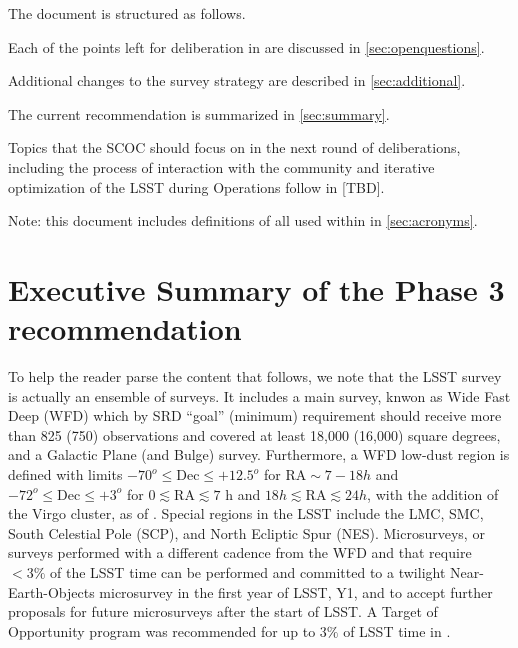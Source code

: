 The document is structured as follows.


Each of the points left for deliberation in   are discussed in \autoref{sec:openquestions}. 

Additional changes to the survey strategy are described in \autoref{sec:additional}. 

The current recommendation is summarized in \autoref{sec:summary}.

Topics that the SCOC should focus on in the next round of deliberations, including the process of interaction with the community and iterative optimization of the LSST during Operations follow in [TBD].%

Note: this document includes definitions of all  used within in \autoref{sec:acronyms}.

\clearpage

\section{Executive Summary of the Phase 3 recommendation}


To help the reader parse the content that follows, we note that the LSST survey is actually an ensemble of surveys. It includes a main survey, knwon as Wide Fast Deep (WFD) which by SRD ``goal'' (minimum) requirement should receive more than 825 (750) observations and covered at least 18,000 (16,000) square degrees, and a Galactic Plane (and Bulge) survey. Furthermore, a WFD low-dust region is defined with limits $-70^o \leq \mathrm{Dec} \leq +12.5^o$ for 
$\mathrm{RA} \sim   7-18 h$ and $-72^o \leq \mathrm{Dec}\leq +3^o$
for $0 \lesssim \mathrm{RA} \lesssim 7$ h and $18 h \lesssim \mathrm{RA} \lesssim 24 h$, with the addition of the Virgo cluster, as of .  Special regions in the LSST include the LMC, SMC, South Celestial Pole (SCP), and North Ecliptic Spur (NES). Microsurveys, or surveys performed with a different cadence from the WFD and that require $<3\%$ of the LSST time can be performed and  committed to a twilight Near-Earth-Objects microsurvey in the first year of LSST, Y1, and to accept further proposals for future microsurveys after the start of LSST. A Target of Opportunity program was recommended for up to $3\%$ of LSST time in .

